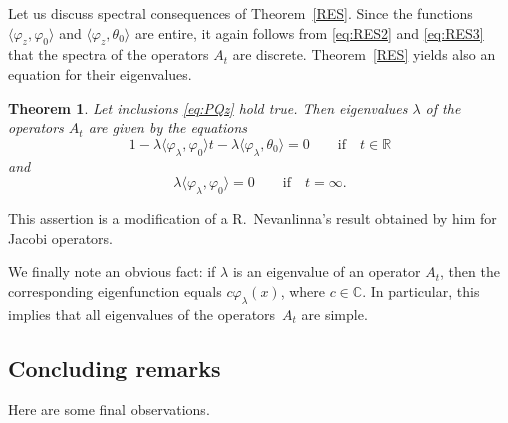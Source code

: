 \documentclass[10pt,a4paper]{amsart}
\numberwithin{equation}{section}
\newtheorem{Theorem}{Theorem}[section]
\begin{document}
 Let us discuss spectral consequences of Theorem~\ref{RES}. Since the functions $ \langle \varphi_{z}, \varphi_{0}\rangle $ and $ \langle \varphi_{z}, \theta_{0}\rangle $ are entire, it again follows from \eqref{eq:RES2} and \eqref{eq:RES3} that the spectra of the operators $A_{t}$ are discrete. Theorem~\ref{RES} yields also an equation for their eigenvalues.

 \begin{Theorem}\label{RESp}
 Let inclusions \eqref{eq:PQz} hold true.
 Then eigenvalues $\lambda $ of the operators $A_{t}$ are given by the equations
 \begin{equation}
 1 - \lambda \langle \varphi_{\lambda}, \varphi_{0}\rangle t - \lambda \langle \varphi_{\lambda}, \theta_{0}\rangle =0 \qquad \mbox{if}\quad t\in {\mathbb R}
 \label{eq:RESp2}\end{equation}
 and
 \begin{equation}
\lambda \langle \varphi_{\lambda}, \varphi_{0}\rangle =0 \qquad \mbox{if} \quad t=\infty.
 \label{eq:RES3p}\end{equation}
 \end{Theorem}

 This assertion is a modification of a R.~Nevanlinna's result obtained by him for Jacobi ope\-rators.

 We finally note an obvious fact: if $\lambda $ is an eigenvalue of an operator $A_{t}$, then the corresponding eigenfunction equals $c\varphi_{\lambda} (x)$, where $c\in{\mathbb C}$. In particular, this implies that all eigenvalues of the operators~$A_{t}$ are simple.

\subsection{Concluding remarks}\label{section3.4}

Here are some final observations.
\end{document}
